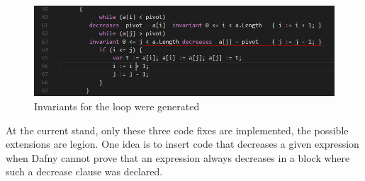   \begin{figure}[H]
	\centering
	\includegraphics[width=1\textwidth]{img/indexChecked}
	\caption{Invariants for the loop were generated}
	\label{fig:indexInBound}
\end{figure}
At the current stand, only these three code fixes are implemented, the possible extensions are legion. One idea is to insert code that decreases a given expression when Dafny cannot prove that an expression always decreases in a block where such a decrease clause was declared.\newline
